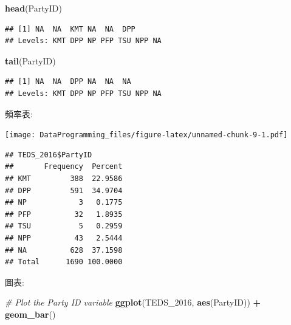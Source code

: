 \documentclass[]{book}
\newenvironment{Shaded}{\begin{snugshade}}{\end{snugshade}}
\newcommand{\CommentTok}[1]{\textcolor[rgb]{0.56,0.35,0.01}{\textit{#1}}}
\newcommand{\DecValTok}[1]{\textcolor[rgb]{0.00,0.00,0.81}{#1}}
\newcommand{\KeywordTok}[1]{\textcolor[rgb]{0.13,0.29,0.53}{\textbf{#1}}}
\newcommand{\NormalTok}[1]{#1}
\newcommand{\OperatorTok}[1]{\textcolor[rgb]{0.81,0.36,0.00}{\textbf{#1}}}
\newcommand{\StringTok}[1]{\textcolor[rgb]{0.31,0.60,0.02}{#1}}
\begin{document}
\begin{Shaded}
\begin{Highlighting}[]
\KeywordTok{head}\NormalTok{(PartyID)}
\end{Highlighting}
\end{Shaded}

\begin{verbatim}
## [1] NA  NA  KMT NA  NA  DPP
## Levels: KMT DPP NP PFP TSU NPP NA
\end{verbatim}

\begin{Shaded}
\begin{Highlighting}[]
\KeywordTok{tail}\NormalTok{(PartyID)}
\end{Highlighting}
\end{Shaded}

\begin{verbatim}
## [1] NA  NA  DPP NA  NA  NA 
## Levels: KMT DPP NP PFP TSU NPP NA
\end{verbatim}

頻率表:

\begin{Shaded}
\end{Shaded}

\texttt{[image: DataProgramming\_files/figure-latex/unnamed-chunk-9-1.pdf]}

\begin{verbatim}
## TEDS_2016$PartyID 
##       Frequency  Percent
## KMT         388  22.9586
## DPP         591  34.9704
## NP            3   0.1775
## PFP          32   1.8935
## TSU           5   0.2959
## NPP          43   2.5444
## NA          628  37.1598
## Total      1690 100.0000
\end{verbatim}

圖表:

\begin{Shaded}
\begin{Highlighting}[]
\CommentTok{# Plot the Party ID variable}
\KeywordTok{ggplot}\NormalTok{(TEDS_}\DecValTok{2016}\NormalTok{, }\KeywordTok{aes}\NormalTok{(PartyID)) }\OperatorTok{+}\StringTok{ }
\StringTok{  }\KeywordTok{geom_bar}\NormalTok{()}
\end{Highlighting}
\end{Shaded}
\end{document}
